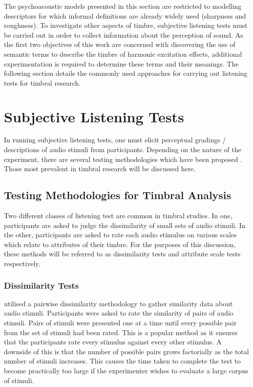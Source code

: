 		The psychoacoustic models presented in this section are restricted to modelling descriptors for which
		informal definitions are already widely used (sharpness and roughness). To investigate other aspects of
		timbre, subjective listening tests must be carried out in order to collect information about the perception
		of sound. As the first two objectives of this work are concerned with discovering the use of semantic terms
		to describe the timbre of harmonic excitation effects, additional experimentation is required to determine
		these terms and their meanings. The following section details the commonly used approaches for carrying out
		listening tests for timbral research.
		
\section{Subjective Listening Tests}
\label{sec:Timbre-ListeningTests}
	In running subjective listening tests, one must elicit perceptual gradings / descriptions of audio stimuli from
	participants. Depending on the nature of the experiment, there are several testing methodologies which have been
	proposed \citep{bech2006perceptual}. Those most prevalent in timbral research will be discussed here.

	\subsection{Testing Methodologies for Timbral Analysis}
	\label{sec:Timbre-ListeningTests-Methods}
		Two different classes of listening test are common in timbral studies. In one, participants are asked to
		judge the dissimilarity of small sets of audio stimuli. In the other, participants are asked to rate each
		audio stimulus on various scales which relate to attributes of their timbre. For the purposes of this
		discussion, these methods will be referred to as dissimilarity tests and attribute scale tests
		respectively.

		\subsubsection*{Dissimilarity Tests}
			\citet{grey1977multidimensional} utilised a pairwise dissimilarity methodology to gather similarity
			data about audio stimuli. Participants were asked to rate the similarity of pairs of audio stimuli.
			Pairs of stimuli were presented one at a time until every possible pair from the set of stimuli had
			been rated. This is a popular method as it ensures that the participants rate every stimulus
			against every other stimulus. A downside of this is that the number of possible pairs grows
			factorially as the total number of stimuli increases. This causes the time taken to complete the
			test to become practically too large if the experimenter wishes to evaluate a large corpus of
			stimuli.

